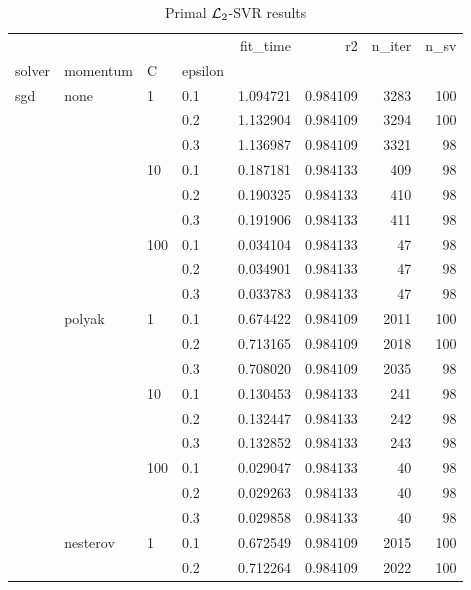 \begin{table}[H]
\centering
\caption{Primal $\protect \mathcal{L}_2$-SVR results}
\label{primal_l2_svr_cv_results}
\begin{tabular}{llllrrrr}
\toprule
          &   &     &     &  fit\_time &        r2 &  n\_iter &  n\_sv \\
solver & momentum & C & epsilon &           &           &         &       \\
\midrule
sgd & none & 1   & 0.1 &  1.094721 &  0.984109 &    3283 &   100 \\
          &   &     & 0.2 &  1.132904 &  0.984109 &    3294 &   100 \\
          &   &     & 0.3 &  1.136987 &  0.984109 &    3321 &    98 \\
          &   & 10  & 0.1 &  0.187181 &  0.984133 &     409 &    98 \\
          &   &     & 0.2 &  0.190325 &  0.984133 &     410 &    98 \\
          &   &     & 0.3 &  0.191906 &  0.984133 &     411 &    98 \\
          &   & 100 & 0.1 &  0.034104 &  0.984133 &      47 &    98 \\
          &   &     & 0.2 &  0.034901 &  0.984133 &      47 &    98 \\
          &   &     & 0.3 &  0.033783 &  0.984133 &      47 &    98 \\
          & polyak & 1   & 0.1 &  0.674422 &  0.984109 &    2011 &   100 \\
          &   &     & 0.2 &  0.713165 &  0.984109 &    2018 &   100 \\
          &   &     & 0.3 &  0.708020 &  0.984109 &    2035 &    98 \\
          &   & 10  & 0.1 &  0.130453 &  0.984133 &     241 &    98 \\
          &   &     & 0.2 &  0.132447 &  0.984133 &     242 &    98 \\
          &   &     & 0.3 &  0.132852 &  0.984133 &     243 &    98 \\
          &   & 100 & 0.1 &  0.029047 &  0.984133 &      40 &    98 \\
          &   &     & 0.2 &  0.029263 &  0.984133 &      40 &    98 \\
          &   &     & 0.3 &  0.029858 &  0.984133 &      40 &    98 \\
          & nesterov & 1   & 0.1 &  0.672549 &  0.984109 &    2015 &   100 \\
          &   &     & 0.2 &  0.712264 &  0.984109 &    2022 &   100 \\

\end{tabular}
\end{table}
